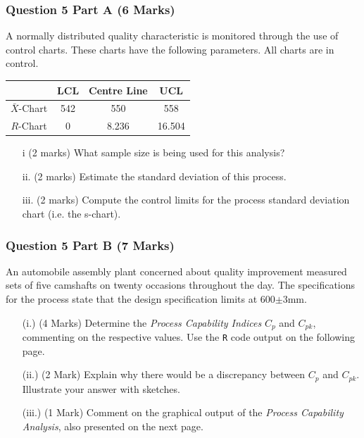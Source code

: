 \documentclass[a4paper,12pt]{article}
\begin{document}
\subsubsection*{Question 5 Part A (6 Marks)}
A normally distributed quality characteristic is monitored through the use of control charts. These charts have the following parameters. All charts are in control.
\begin{center}
	\begin{tabular}{|c|c|c|c|}
		\hline  & LCL & Centre Line & UCL \\
		\hline $\bar{X}$-Chart & 542 & 550 & 558 \\
		\hline $R$-Chart & 0 & 8.236 & 16.504 \\ \hline
	\end{tabular}
\end{center}

\begin{itemize}
	\item[i] (2 marks) What sample size is being used for this analysis?
	\item[ii.] (2 marks) Estimate the standard deviation of this process.
	\item[iii.] (2 marks) Compute the control limits for the process standard deviation chart (i.e. the s-chart).
\end{itemize}


\subsubsection*{Question 5 Part B (7 Marks)}
An automobile assembly plant concerned about quality improvement measured sets of five camshafts on twenty occasions throughout the day. The specifications for the process state that the design specification limits at 600$\pm$3mm.


\begin{itemize}
	\item[(i.)] (4 Marks) Determine the \emph{Process Capability Indices} $C_p$ and $C_{pk}$, commenting on the respective values. Use the \texttt{R} code output on the following page.
	\item[(ii.)] (2 Mark)  Explain why there would be a discrepancy between $C_p$ and $C_{pk}$. Illustrate your answer with sketches.
	\item[(iii.)] (1 Mark) Comment on the graphical output of the \emph{Process Capability Analysis}, also presented on the next page.
\end{itemize}
\end{document}
